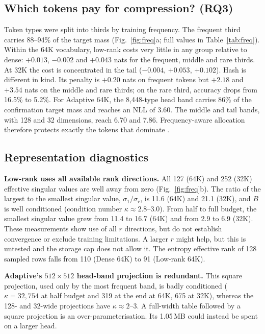\documentclass[10pt,a4paper]{article}
\newcommand{\bpb}{\text{BPB}}
\begin{document}
\subsection{Which tokens pay for compression? (RQ3)}
Token types were split into thirds by training frequency. The frequent third carries 88--94\% of the
target mass (Fig.~\ref{fig:freq}a; full values in Table~\ref{tab:freq}). Within the 64K vocabulary, low-rank costs very little in any group
relative to dense: $+0.013$, $-0.002$ and $+0.043$ nats for the frequent, middle and rare thirds. At 32K the
cost is concentrated in the tail ($-0.004$, $+0.053$, $+0.102$). Hash is different in kind. Its penalty is
$+0.20$ nats on frequent tokens but $+2.18$ and $+3.54$ nats on the middle and rare thirds; on the rare third,
accuracy drops from 16.5\% to 5.2\%. For Adaptive 64K, the 8,448-type head band carries 86\% of the confirmation target
mass and reaches an NLL of 3.60. The middle and tail bands, with 128 and 32 dimensions, reach 6.70 and
7.86. Frequency-aware allocation therefore protects exactly the tokens that dominate \bpb.

\subsection{Representation diagnostics}
\textbf{Low-rank uses all available rank directions.} All 127 (64K) and 252 (32K) effective singular values are well
away from zero (Fig.~\ref{fig:freq}b). The ratio of the largest to the smallest singular value,
$\sigma_1/\sigma_r$, is 11.6 (64K) and 21.1 (32K), and $B$ is well conditioned (condition number
$\kappa\approx2.8$--$3.0$). From half to full budget, the smallest singular value grew from
11.4 to 16.7 (64K) and from 2.9 to 6.9 (32K). These measurements show use of all $r$ directions, but do not
establish convergence or exclude training limitations. A larger $r$ might help, but this is untested and the
storage cap does not allow it. The entropy effective rank \citep{roy2007effrank} of 128
sampled rows falls from 110 (Dense 64K) to 91 (Low-rank 64K).

\textbf{Adaptive's $512\times512$ head-band projection is redundant.} This square projection, used only by the most frequent band,
is badly conditioned ($\kappa=32{,}754$ at half budget and 319 at the end at 64K, 675 at 32K), whereas the 128- and
32-wide projections have $\kappa\approx2$--$3$. A full-width table followed by a square projection is an
over-parameterisation. Its 1.05\,MB could instead be spent on a larger head.
\end{document}
